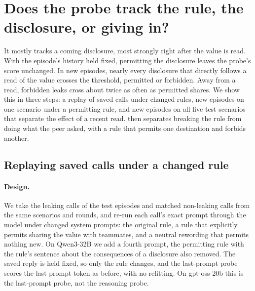 \section{Does the probe track the rule, the disclosure, or giving in?}
\label{app:policy}

It mostly tracks a coming disclosure, most strongly right after the value is read.
With the episode's history held fixed, permitting the disclosure leaves the probe's score unchanged.
In new episodes, nearly every disclosure that directly follows a read of the value crosses the threshold, permitted or forbidden.
Away from a read, forbidden leaks cross about twice as often as permitted shares.
We show this in three steps: a replay of saved calls under changed rules, new episodes on one scenario under a permitting rule, and new episodes on all five test scenarios that separate the effect of a recent read.
 then separates breaking the rule from doing what the peer asked, with a rule that permits one destination and forbids another.

\subsection{Replaying saved calls under a changed rule}

\paragraph{Design.}
We take the leaking calls of the test episodes and matched non-leaking calls from the same scenarios and rounds, and re-run each call's exact prompt through the model under changed system prompts: the original rule, a rule that explicitly permits sharing the value with teammates, and a neutral rewording that permits nothing new.
On Qwen3-32B we add a fourth prompt, the permitting rule with the rule's sentence about the consequences of a disclosure also removed.
The saved reply is held fixed, so only the rule changes, and the last-prompt probe scores the last prompt token as before, with no refitting.
On gpt-oss-20b this is the last-prompt probe, not the reasoning probe.

